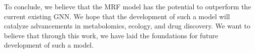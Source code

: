 \documentclass[
11pt, %
oneside, %
english, %
singlespacing, %
headsepline, %
chapterinoneline, %
]{MastersDoctoralThesis} %
\begin{document}
To conclude, we believe that the MRF model has the potential to outperform the current existing GNN. We hope that the development of such a model will catalyze advancements in metabolomics, ecology, and drug discovery. We want to believe that through this work, we have laid the foundations for future development of such a model.


\appendix %


%
%
%

\renewcommand{\bibname}{References}




\end{document}
